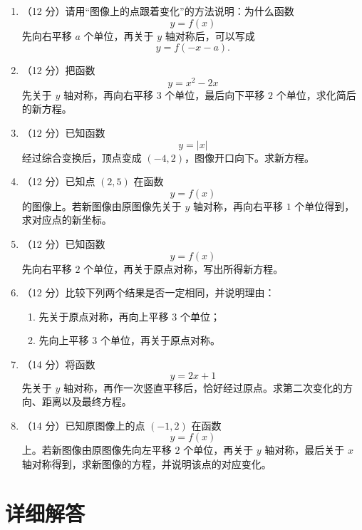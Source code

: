 \documentclass[11pt,a4paper,fontset=fandol]{ctexart}
\newcommand{\answerspace}{\vspace{2.3cm}}
\newcommand{\biganswerspace}{\vspace{3.2cm}}
\begin{document}
\begin{enumerate}
  \item （12 分）请用“图像上的点跟着变化”的方法说明：为什么函数
  \[
  y=f(x)
  \]
  先向右平移 $a$ 个单位，再关于 \(y\) 轴对称后，可以写成
  \[
  y=f(-x-a).
  \]
  \biganswerspace

  \item （12 分）把函数
  \[
  y=x^2-2x
  \]
  先关于 \(y\) 轴对称，再向右平移 $3$ 个单位，最后向下平移 $2$ 个单位，求化简后的新方程。
  \answerspace

  \item （12 分）已知函数
  \[
  y=|x|
  \]
  经过综合变换后，顶点变成 \((-4,2)\)，图像开口向下。求新方程。
  \answerspace

  \item （12 分）已知点 \((2,5)\) 在函数
  \[
  y=f(x)
  \]
  的图像上。若新图像由原图像先关于 \(y\) 轴对称，再向右平移 $1$ 个单位得到，求对应点的新坐标。
  \answerspace

  \item （12 分）已知函数
  \[
  y=f(x)
  \]
  先向右平移 $2$ 个单位，再关于原点对称，写出所得新方程。
  \answerspace

  \item （12 分）比较下列两个结果是否一定相同，并说明理由：
  \begin{enumerate}
    \item 先关于原点对称，再向上平移 $3$ 个单位；
    \item 先向上平移 $3$ 个单位，再关于原点对称。
  \end{enumerate}
  \answerspace

  \item （14 分）将函数
  \[
  y=2x+1
  \]
  先关于 \(y\) 轴对称，再作一次竖直平移后，恰好经过原点。求第二次变化的方向、距离以及最终方程。
  \biganswerspace

  \item （14 分）已知原图像上的点 \((-1,2)\) 在函数
  \[
  y=f(x)
  \]
  上。若新图像由原图像先向左平移 $2$ 个单位，再关于 \(y\) 轴对称，最后关于 \(x\) 轴对称得到，求新图像的方程，并说明该点的对应变化。
  \biganswerspace
\end{enumerate}

\newpage
\section{详细解答}
\end{document}
